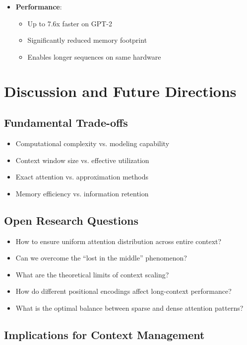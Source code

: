 \documentclass[11pt,letterpaper]{article}
\begin{document}
\begin{itemize}[leftmargin=*]
    \item \textbf{Performance}:
    \begin{itemize}
        \item Up to 7.6x faster on GPT-2
        \item Significantly reduced memory footprint
        \item Enables longer sequences on same hardware
    \end{itemize}
\end{itemize}

\section{Discussion and Future Directions}

\subsection{Fundamental Trade-offs}

\begin{itemize}[leftmargin=*]
    \item Computational complexity vs. modeling capability
    \item Context window size vs. effective utilization
    \item Exact attention vs. approximation methods
    \item Memory efficiency vs. information retention
\end{itemize}

\subsection{Open Research Questions}

\begin{itemize}[leftmargin=*]
    \item How to ensure uniform attention distribution across entire context?
    \item Can we overcome the ``lost in the middle'' phenomenon?
    \item What are the theoretical limits of context scaling?
    \item How do different positional encodings affect long-context performance?
    \item What is the optimal balance between sparse and dense attention patterns?
\end{itemize}

\subsection{Implications for Context Management}
\end{document}
